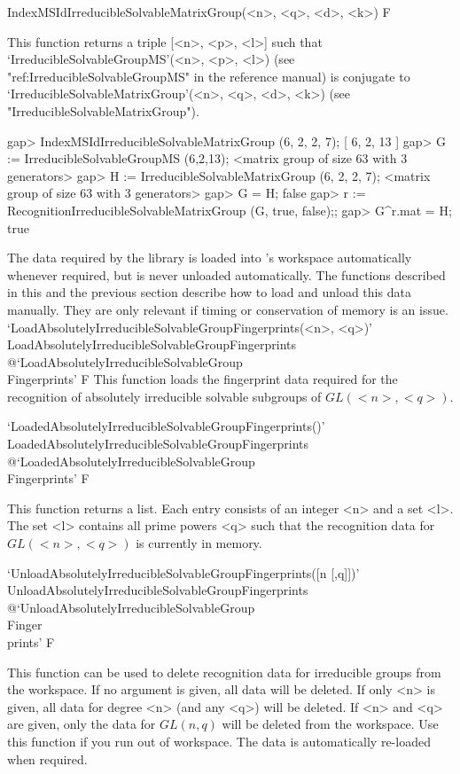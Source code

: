 \>IndexMSIdIrreducibleSolvableMatrixGroup(<n>, <q>, <d>, <k>) F

This function returns a triple [<n>, <p>, <l>] such that
`IrreducibleSolvableGroupMS'(<n>, <p>, <l>) (see "ref:IrreducibleSolvableGroupMS" in the {\GAP} reference manual) is conjugate to
`IrreducibleSolvableMatrixGroup'(<n>, <q>, <d>, <k>) (see "IrreducibleSolvableMatrixGroup").

\beginexample
gap> IndexMSIdIrreducibleSolvableMatrixGroup (6, 2, 2, 7);
[ 6, 2, 13 ]
gap> G := IrreducibleSolvableGroupMS (6,2,13);
<matrix group of size 63 with 3 generators>
gap> H := IrreducibleSolvableMatrixGroup (6, 2, 2, 7);
<matrix group of size 63 with 3 generators>
gap> G = H;
false 
gap> r := RecognitionIrreducibleSolvableMatrixGroup (G, true, false);;
gap> G^r.mat = H;
true
\endexample



The data required by the {\IRREDSOL} library is loaded into {\GAP}'s workspace automatically whenever required, but is never unloaded automatically. The functions described in this
and the previous section describe how to load and unload this data manually. 
They are only relevant if timing or conservation of memory is an issue.
\>`LoadAbsolutelyIrreducibleSolvableGroupFingerprints(<n>, <q>)'%
{LoadAbsolutelyIrreducibleSolvableGroupFingerprints}%
@{`LoadAbsolutelyIrreducibleSolvableGroup\\Fingerprints'} F
This function loads the fingerprint data required for the recognition
of absolutely irreducible solvable subgroups of $GL(<n>, <q>)$.

\>`LoadedAbsolutelyIrreducibleSolvableGroupFingerprints()'%
{LoadedAbsolutelyIrreducibleSolvableGroupFingerprints}%
@{`LoadedAbsolutelyIrreducibleSolvableGroup\\Fingerprints'} F

This function returns a list. Each entry consists of an integer <n> and a set <l>. The set
<l> contains all prime powers <q> such that the recognition data for $GL(<n>, <q>)$ is currently in
memory.

\>`UnloadAbsolutelyIrreducibleSolvableGroupFingerprints([n [,q]])'%
{UnloadAbsolutelyIrreducibleSolvableGroupFingerprints}%
@{`UnloadAbsolutelyIrreducibleSolvableGroup\\Finger\\prints'} F

This function can be used to delete recognition data for irreducible groups from the {\GAP} workspace. If no
argument is given, all data will be deleted. If only <n> is given, all data for degree <n> (and any
<q>) will be deleted. If <n> and <q> are given, only the data for $GL(n, q)$ will be deleted from the
{\GAP} workspace. Use this function if you run out of {\GAP} workspace. The
data is automatically re-loaded when required.


